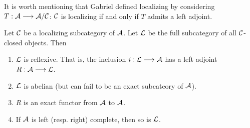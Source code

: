 \begin{rmk}
It is worth mentioning that Gabriel defined localizing by 
considering $T: \mathcal{A} \longrightarrow \mathcal{A}/\mathcal{C}$: $\mathcal{C}$ is 
localizing if and only if $T$ admits a left adjoint.
\end{rmk}

\begin{thm}
Let $\mathcal{C}$ be a localizing subcategory of $\mathcal{A}$. Let
$\mathcal{L}$ be the full subcategory of all $\mathcal{C}$-closed objects.
Then
\begin{enumerate}
\item $\mathcal{L}$ is reflexive. That is, the inclusion $i: \mathcal{L}
\longrightarrow \mathcal{A}$ has a left adjoint $R: \mathcal{A} \longrightarrow \mathcal{L}$.

\item $\mathcal{L}$ is abelian (but can fail to be an exact subcateory
of $\mathcal{A}$).

\item $R$ is an exact functor from $\mathcal{A}$ to $\mathcal{A}$.

\item If $\mathcal{A}$ is left (resp. right) complete, then so is
$\mathcal{L}$.
\end{enumerate}
\end{thm}

